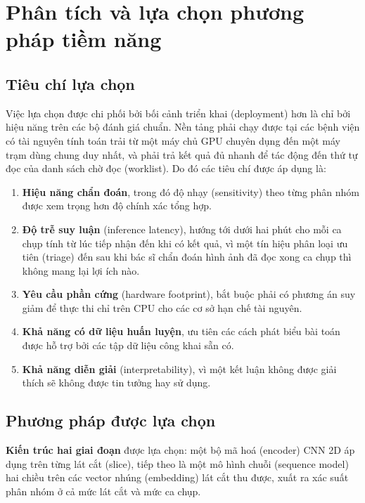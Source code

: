 \section{Phân tích và lựa chọn phương pháp tiềm năng}
\label{sec:selection}

\subsection{Tiêu chí lựa chọn}

Việc lựa chọn được chi phối bởi bối cảnh triển khai (deployment) hơn là chỉ bởi
hiệu năng trên các bộ đánh giá chuẩn. Nền tảng phải chạy được tại các bệnh viện
có tài nguyên tính toán trải từ một máy chủ GPU chuyên dụng đến một máy trạm dùng
chung duy nhất, và phải trả kết quả đủ nhanh để tác động đến thứ tự đọc của danh
sách chờ đọc (worklist). Do đó các tiêu chí được áp dụng là:

\begin{enumerate}[label=C\arabic*.,leftmargin=1.2cm]
    \item \textbf{Hiệu năng chẩn đoán}, trong đó độ nhạy (sensitivity) theo từng
          phân nhóm được xem trọng hơn độ chính xác tổng hợp.
    \item \textbf{Độ trễ suy luận} (inference latency), hướng tới dưới hai phút
          cho mỗi ca chụp tính từ lúc tiếp nhận đến khi có kết quả, vì một tín
          hiệu phân loại ưu tiên (triage) đến sau khi bác sĩ chẩn đoán hình ảnh
          đã đọc xong ca chụp thì không mang lại lợi ích nào.
    \item \textbf{Yêu cầu phần cứng} (hardware footprint), bắt buộc phải có
          phương án suy giảm để thực thi chỉ trên CPU cho các cơ sở hạn chế tài
          nguyên.
    \item \textbf{Khả năng có dữ liệu huấn luyện}, ưu tiên các cách phát biểu bài
          toán được hỗ trợ bởi các tập dữ liệu công khai sẵn có.
    \item \textbf{Khả năng diễn giải} (interpretability), vì một kết luận không
          được giải thích sẽ không được tin tưởng hay sử dụng.
\end{enumerate}

\subsection{Phương pháp được lựa chọn}

\textbf{Kiến trúc hai giai đoạn} được lựa chọn: một bộ mã hoá (encoder) CNN 2D
áp dụng trên từng lát cắt (slice), tiếp theo là một mô hình chuỗi (sequence
model) hai chiều trên các vector nhúng (embedding) lát cắt thu được, xuất ra xác
suất phân nhóm ở cả mức lát cắt và mức ca chụp.

